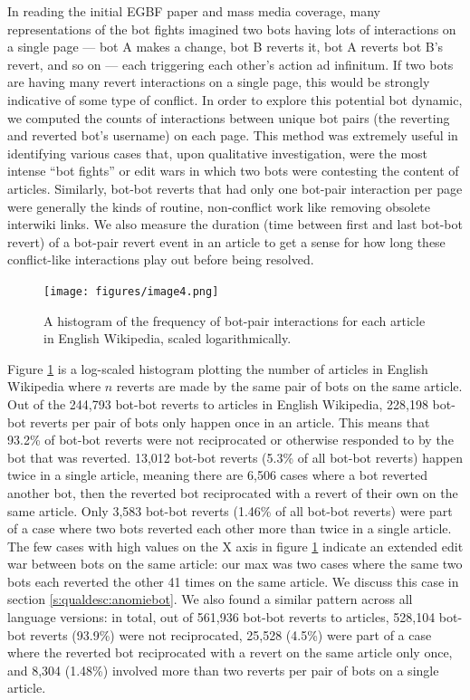 \documentclass[format=acmsmall, review=false, screen=true]{acmart}%
\begin{document}
In reading the initial EGBF paper and mass media coverage, many representations of the bot fights imagined two bots having lots of interactions on a single page --- bot A makes a change, bot B reverts it, bot A reverts bot B's revert, and so on --- each triggering each other's action ad infinitum. If two bots are having many revert interactions on a single page, this would be strongly indicative of some type of conflict. In order to explore this potential bot dynamic, we computed the counts of interactions between unique bot pairs (the reverting and reverted bot's username) on each page. This method was extremely useful in identifying various cases that, upon qualitative investigation, were the most intense ``bot fights'' or edit wars in which two bots were contesting the content of articles. Similarly, bot-bot reverts that had only one bot-pair interaction per page were generally the kinds of routine, non-conflict work like removing obsolete interwiki links. We also measure the duration (time between first and last bot-bot revert) of a bot-pair revert event in an article to get a sense for how long these conflict-like interactions play out before being resolved.  

\begin{figure}
        \texttt{[image: figures/image4.png]}
        \caption{A histogram of the frequency of bot-pair interactions for each article in English Wikipedia, scaled logarithmically.}
        \label{fig:botpair-hist}
\end{figure}
Figure \ref{fig:botpair-hist} is a log-scaled histogram plotting the number of articles in English Wikipedia where $n$ reverts are made by the same pair of bots on the same article. Out of the 244,793 bot-bot reverts to articles in English Wikipedia, 228,198 bot-bot reverts per pair of bots only happen once in an article. This means that 93.2\% of bot-bot reverts were not reciprocated or otherwise responded to by the bot that was reverted. 13,012 bot-bot reverts (5.3\% of all bot-bot reverts) happen twice in a single article, meaning there are 6,506 cases where a bot reverted another bot, then the reverted bot reciprocated with a revert of their own on the same article. Only 3,583 bot-bot reverts (1.46\% of all bot-bot reverts) were part of a case where two bots reverted each other more than twice in a single article. The few cases with high values on the X axis in figure \ref{fig:botpair-hist} indicate an extended edit war between bots on the same article: our max was two cases where the same two bots each reverted the other 41 times on the same article. We discuss this case in section \ref{s:qualdesc:anomiebot}. We also found a similar pattern across all language versions: in total, out of 561,936 bot-bot reverts to articles, 528,104 bot-bot reverts (93.9\%) were not reciprocated, 25,528 (4.5\%) were part of a case where the reverted bot reciprocated with a revert on the same article only once, and 8,304 (1.48\%) involved more than two reverts per pair of bots on a single article.
\end{document}
